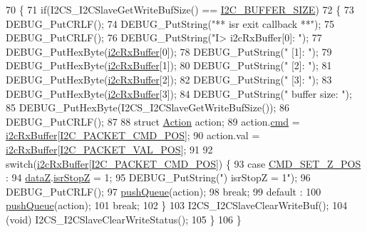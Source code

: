 \begin{DoxyCode}
70 \{
71   \textcolor{keywordflow}{if}(I2CS\_I2CSlaveGetWriteBufSize() == \hyperlink{i2c_8h_a6458dbf193a0eef0470fc1b08400bfcd}{I2C\_BUFFER\_SIZE})
72   \{
73     DEBUG\_PutCRLF();
74     DEBUG\_PutString(\textcolor{stringliteral}{"** isr exit callback **"});
75     DEBUG\_PutCRLF();
76     DEBUG\_PutString(\textcolor{stringliteral}{"I> i2cRxBuffer[0]: "});
77     DEBUG\_PutHexByte(\hyperlink{class_i2_c_a711782550427eea544dabe5394d79a9b}{i2cRxBuffer}[0]);
78     DEBUG\_PutString(\textcolor{stringliteral}{" [1]: "});
79     DEBUG\_PutHexByte(\hyperlink{class_i2_c_a711782550427eea544dabe5394d79a9b}{i2cRxBuffer}[1]);
80     DEBUG\_PutString(\textcolor{stringliteral}{" [2]: "});
81     DEBUG\_PutHexByte(\hyperlink{class_i2_c_a711782550427eea544dabe5394d79a9b}{i2cRxBuffer}[2]);
82     DEBUG\_PutString(\textcolor{stringliteral}{" [3]: "});
83     DEBUG\_PutHexByte(\hyperlink{class_i2_c_a711782550427eea544dabe5394d79a9b}{i2cRxBuffer}[3]);
84     DEBUG\_PutString(\textcolor{stringliteral}{" buffer size: "});
85     DEBUG\_PutHexByte(I2CS\_I2CSlaveGetWriteBufSize());
86     DEBUG\_PutCRLF();
87     
88     \textcolor{keyword}{struct }\hyperlink{queue_8h_df/d8c/struct_action}{Action} action;
89     action.\hyperlink{queue_8h_a85092d82ab6ea85dad51ba78cbda36a0}{cmd} = \hyperlink{class_i2_c_a711782550427eea544dabe5394d79a9b}{i2cRxBuffer}[\hyperlink{i2c_8h_ac13fcfeded7dc2d82fa4734456f3761f}{I2C\_PACKET\_CMD\_POS}];
90     action.val = \hyperlink{class_i2_c_a711782550427eea544dabe5394d79a9b}{i2cRxBuffer}[\hyperlink{i2c_8h_a68506c3651f015716bb2c135e8e7b972}{I2C\_PACKET\_VAL\_POS}];
91     
92     \textcolor{keywordflow}{switch}(\hyperlink{class_i2_c_a711782550427eea544dabe5394d79a9b}{i2cRxBuffer}[\hyperlink{i2c_8h_ac13fcfeded7dc2d82fa4734456f3761f}{I2C\_PACKET\_CMD\_POS}]) \{
93       \textcolor{keywordflow}{case} \hyperlink{handler_8h_a6e695093ea021ccac7cc5d2d788095c9}{CMD\_SET\_Z\_POS} :
94         \hyperlink{data_8h_ace1aa5b973b9358f7236c0c9deca9370}{dataZ}.\hyperlink{data_8h_ae55ff8378d0a07b118000a98b273141f}{isrStopZ} = 1;
95         DEBUG\_PutString(\textcolor{stringliteral}{") isrStopZ = 1"});
96         DEBUG\_PutCRLF();
97         \hyperlink{queue_8h_a0012fa831aa1529e5ed3a6610b733423}{pushQueue}(action);
98         \textcolor{keywordflow}{break};
99       \textcolor{keywordflow}{default} :
100         \hyperlink{queue_8h_a0012fa831aa1529e5ed3a6610b733423}{pushQueue}(action);
101         \textcolor{keywordflow}{break};
102     \}
103     I2CS\_I2CSlaveClearWriteBuf();
104     (void) I2CS\_I2CSlaveClearWriteStatus();
105   \}
106 \}
\end{DoxyCode}


